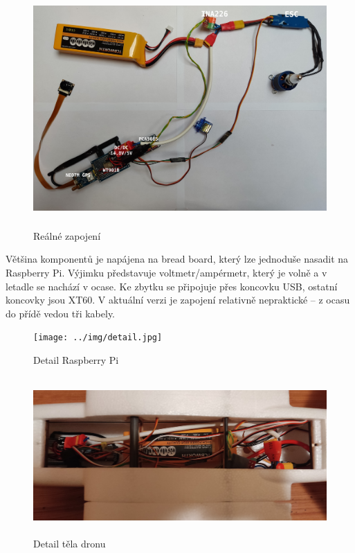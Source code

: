 \documentclass[a4paper,oneside,12pt]{report}
\begin{document}
\begin{figure}[h]
  \centering
  \includegraphics[height=9cm]{../img/circuit.jpg}
  \caption[Reálné zapojení]{Reálné zapojení\footnotemark}
\end{figure}

Většina komponentů je napájena na bread board, který lze jednoduše nasadit na Raspberry Pi.
Výjimku představuje voltmetr/ampérmetr, který je volně a v letadle se nachází v ocase.
Ke zbytku se připojuje přes koncovku USB, ostatní koncovky jsou XT60.
V aktuální verzi je zapojení relativně nepraktické -- z ocasu do přídě vedou tři kabely.

\begin{figure}[h]
  \centering
  \texttt{[image: ../img/detail.jpg]}
  \caption[Detail Raspberry Pi]{Detail Raspberry Pi}
\end{figure}


\newpage

\begin{figure}[h]
  \centering
  \includegraphics[height=6cm]{../img/body.jpg}
  \caption[Detail těla dronu]{Detail těla dronu}
\end{figure}
\end{document}
